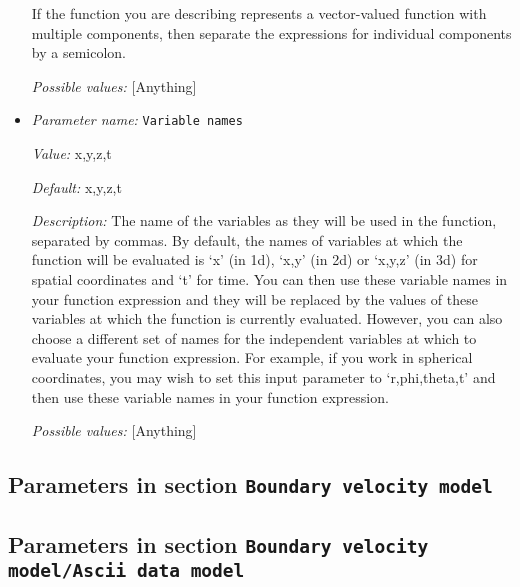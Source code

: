 \begin{itemize}
If the function you are describing represents a vector-valued function with multiple components, then separate the expressions for individual components by a semicolon.


{\it Possible values:} [Anything]
\item {\it Parameter name:} {\tt Variable names}
\label{parameters:Boundary traction model/Function/Variable names}


{\it Value:} x,y,z,t


{\it Default:} x,y,z,t


{\it Description:} The name of the variables as they will be used in the function, separated by commas. By default, the names of variables at which the function will be evaluated is `x' (in 1d), `x,y' (in 2d) or `x,y,z' (in 3d) for spatial coordinates and `t' for time. You can then use these variable names in your function expression and they will be replaced by the values of these variables at which the function is currently evaluated. However, you can also choose a different set of names for the independent variables at which to evaluate your function expression. For example, if you work in spherical coordinates, you may wish to set this input parameter to `r,phi,theta,t' and then use these variable names in your function expression.


{\it Possible values:} [Anything]
\end{itemize}

\subsection{Parameters in section \tt Boundary velocity model}
\label{parameters:Boundary_20velocity_20model}


\subsection{Parameters in section \tt Boundary velocity model/Ascii data model}
\label{parameters:Boundary_20velocity_20model/Ascii_20data_20model}


